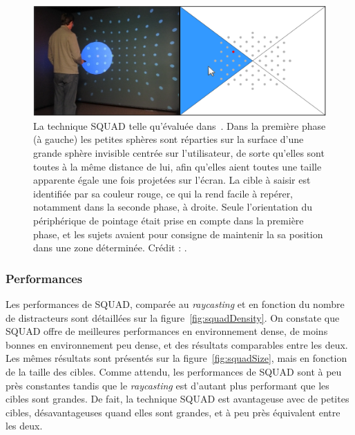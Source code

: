 	\begin{figure}[H]
		\centering
		\includegraphics[width=\textwidth]{figures/ch2/squad2}
		\caption[La technique SQUAD -- évaluation]{La technique SQUAD telle qu'évaluée dans~\cite{kopper2011rapid}. Dans la première phase (à gauche) les petites sphères sont réparties sur la surface d'une grande sphère invisible centrée sur l'utilisateur, de sorte qu'elles sont toutes à la même distance de lui, afin qu'elles aient toutes une taille apparente égale une fois projetées sur l'écran. La cible à saisir est identifiée par sa couleur rouge, ce qui la rend facile à repérer, notamment dans la seconde phase, à droite. Seule l'orientation du périphérique de pointage était prise en compte dans la première phase, et les sujets avaient pour consigne de maintenir la sa position dans une zone déterminée. Crédit : \cite{kopper2011rapid}.}
		\label{fig:squad2}
	\end{figure}
	
	\subsubsection{Performances}
	Les performances de SQUAD, comparée au \emph{raycasting} et en fonction du nombre de distracteurs sont détaillées sur la figure~\ref{fig:squadDensity}. On constate que SQUAD offre de meilleures performances en environnement dense, de moins bonnes en environnement peu dense, et des résultats comparables entre les deux. Les mêmes résultats sont présentés sur la figure~\ref{fig:squadSize}, mais en fonction de la taille des cibles. Comme attendu, les performances de SQUAD sont à peu près constantes tandis que le \emph{raycasting} est d'autant plus performant que les cibles sont grandes. De fait, la technique SQUAD est avantageuse avec de petites cibles, désavantageuses quand elles sont grandes, et à peu près équivalent entre les deux.
	
